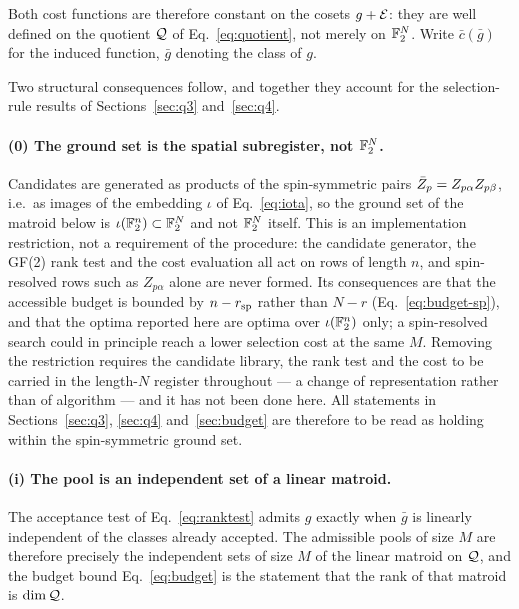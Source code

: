 Both cost functions are therefore constant on the cosets $g+\mathcal E$: they are
well defined on the quotient $\mathcal Q$ of Eq.~\eqref{eq:quotient}, not merely on
$\mathbb F_2^{N}$. Write $\bar c(\bar g)$ for the induced function, $\bar g$ denoting
the class of $g$.

Two structural consequences follow, and together they account for the
selection-rule results of Sections~\ref{sec:q3} and~\ref{sec:q4}.

\paragraph{(0) The ground set is the spatial subregister, not $\mathbb F_2^{N}$.}
\begin{sloppypar}
Candidates are generated as products of the spin-symmetric pairs
$\bar Z_p=Z_{p\alpha}Z_{p\beta}$, i.e.\ as images of the embedding $\iota$ of
Eq.~\eqref{eq:iota}, so the ground set of the matroid below is
$\iota(\mathbb F_2^{n})\subset\mathbb F_2^{N}$ and not $\mathbb F_2^{N}$ itself. This is an
implementation restriction, not a requirement of the procedure: the candidate
generator, the GF(2) rank test and the cost evaluation all act on rows of
length $n$, and spin-resolved rows such as $Z_{p\alpha}$ alone are never
formed. Its consequences are that the accessible budget is bounded by
$n-r_{\mathrm{sp}}$ rather than $N-r$ (Eq.~\eqref{eq:budget-sp}), and that the optima
reported here are optima over $\iota(\mathbb F_2^{n})$ only; a spin-resolved search
could in principle reach a lower selection cost at the same $M$. Removing the
restriction requires the candidate library, the rank test and the cost to be
carried in the length-$N$ register throughout --- a change of representation
rather than of algorithm --- and it has not been done here. All statements in
Sections~\ref{sec:q3}, \ref{sec:q4} and~\ref{sec:budget} are therefore to be
read as holding within the spin-symmetric ground set.
\end{sloppypar}

\paragraph{(i) The pool is an independent set of a linear matroid.}
The acceptance test of Eq.~\eqref{eq:ranktest} admits $g$ exactly when
$\bar g$ is linearly independent of the classes already accepted. The
admissible pools of size $M$ are therefore precisely the independent sets of
size $M$ of the linear matroid on $\mathcal Q$, and the budget bound
Eq.~\eqref{eq:budget} is the statement that the rank of that matroid is
$\dim\mathcal Q$.


